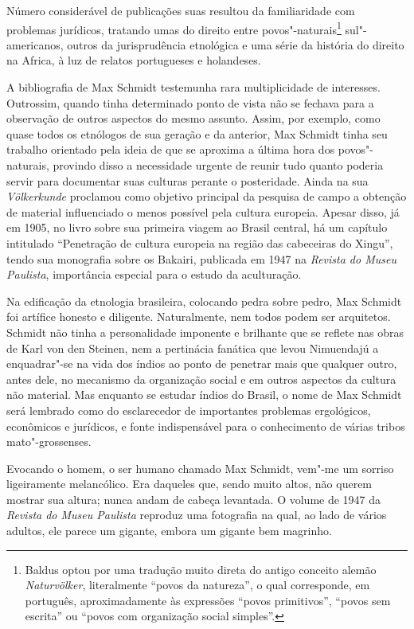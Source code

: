 Número considerável de publicações suas resultou da familiaridade com
problemas jurídicos, tratando umas do direito entre
povos"-naturais\footnote{Baldus optou por uma tradução muito direta do
  antigo conceito alemão \textit{Naturvölker}, literalmente ``povos da
  natureza'', o qual corresponde, em português, aproximadamente às
  expressões ``povos primitivos'', ``povos sem escrita'' ou ``povos com
  organização social simples''.} sul"-americanos, outros da jurisprudência
etnológica e uma série da história do direito na Africa, à luz de
relatos portugueses e holandeses.

A bibliografia de Max Schmidt testemunha rara multiplicidade de
interesses. Outrossim, quando tinha determinado ponto de vista não se
fechava para a observação de outros aspectos do mesmo assunto. Assim,
por exemplo, como quase todos os etnólogos de sua geração e da anterior,
Max Schmidt tinha seu trabalho orientado pela ideia de que se aproxima a
última hora dos povos"-naturais, provindo disso a necessidade urgente de
reunir tudo quanto poderia servir para documentar suas culturas perante
o posteridade. Ainda na sua \textit{Völkerkunde} proclamou como
objetivo principal da pesquisa de campo a obtenção de material
influenciado o menos possível pela cultura europeia. Apesar disso, já em
1905, no livro sobre sua primeira viagem ao Brasil central, há um
capítulo intitulado ``Penetração de cultura europeia na região das
cabeceiras do Xingu'', tendo sua monografia sobre os Bakairi, publicada
em 1947 na \textit{Revista do Museu Paulista}, importância especial para o
estudo da aculturação.

Na edificação da etnologia brasileira, colocando pedra sobre pedro, Max
Schmidt foi artífice honesto e diligente. Naturalmente, nem todos podem
ser arquitetos. Schmidt não tinha a personalidade imponente e brilhante
que se reflete nas obras de Karl von den Steinen, nem a pertinácia
fanática que levou Nimuendajú a enquadrar"-se na vida dos índios ao ponto
de penetrar mais que qualquer outro, antes dele, no mecanismo da
organização social e em outros aspectos da cultura não material. Mas
enquanto se estudar índios do Brasil, o nome de Max Schmidt será
lembrado como do esclarecedor de importantes problemas ergológicos,
econômicos e jurídicos, e fonte indispensável para o conhecimento de
várias tribos mato"-grossenses.


Evocando o homem, o ser humano chamado Max Schmidt, vem"-me um sorriso
ligeiramente melancólico. Era daqueles que, sendo muito altos, não
querem mostrar sua altura; nunca andam de cabeça levantada. O volume de
1947 da \textit{Revista do Museu Paulista} reproduz uma fotografia na
qual, ao lado de vários adultos, ele parece um gigante, embora um
gigante bem magrinho.

